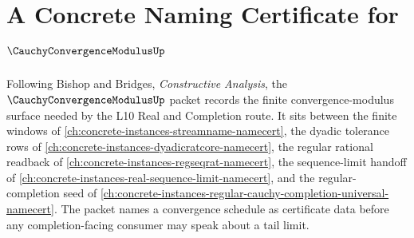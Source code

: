 \chapter{A Concrete Naming Certificate for $\CauchyConvergenceModulusUp$}
\label{ch:concrete-instances-cauchy-convergence-modulus-namecert}

Following Bishop and Bridges, \emph{Constructive Analysis}, the $\CauchyConvergenceModulusUp$ packet records the finite convergence-modulus surface needed by the L10 Real and Completion route. It sits between the finite windows of \autoref{ch:concrete-instances-streamname-namecert}, the dyadic tolerance rows of \autoref{ch:concrete-instances-dyadicratcore-namecert}, the regular rational readback of \autoref{ch:concrete-instances-regseqrat-namecert}, the sequence-limit handoff of \autoref{ch:concrete-instances-real-sequence-limit-namecert}, and the regular-completion seed of \autoref{ch:concrete-instances-regular-cauchy-completion-universal-namecert}. The packet names a convergence schedule as certificate data before any completion-facing consumer may speak about a tail limit.


